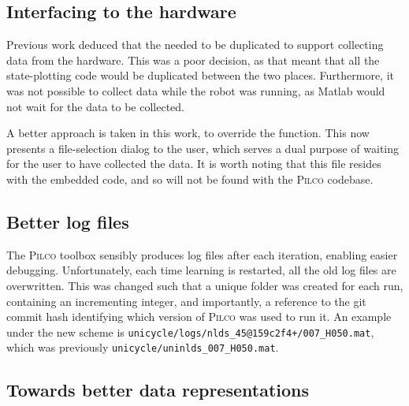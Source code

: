\documentclass[main.tex]{subfiles}
\begin{document}
\subsection{Interfacing to the hardware}

Previous work deduced that the  needed to be duplicated to support collecting data from the hardware.
This was a poor decision, as that meant that all the state-plotting code would be duplicated between the two places.
Furthermore, it was not possible to collect data while the robot was running, as Matlab would not wait for the data to be collected.

A better approach is taken in this work, to override the  function.
This now presents a file-selection dialog to the user, which serves a dual purpose of waiting for the user to have collected the data.
It is worth noting that this file resides with the embedded code, and so will not be found with the \textsc{Pilco} codebase.

\subsection{Better log files}

The \textsc{Pilco} toolbox sensibly produces log files after each iteration, enabling easier debugging.
Unfortunately, each time learning is restarted, all the old log files are overwritten.
This was changed such that a unique folder was created for each run, containing an incrementing integer, and importantly, a reference to the git commit hash identifying which version of \textsc{Pilco} was used to run it. An example under the new scheme is \lstinline{unicycle/logs/nlds_45@159c2f4+/007_H050.mat}, which was previously \lstinline{unicycle/uninlds_007_H050.mat}.

\subsection{Towards better data representations}
\end{document}

